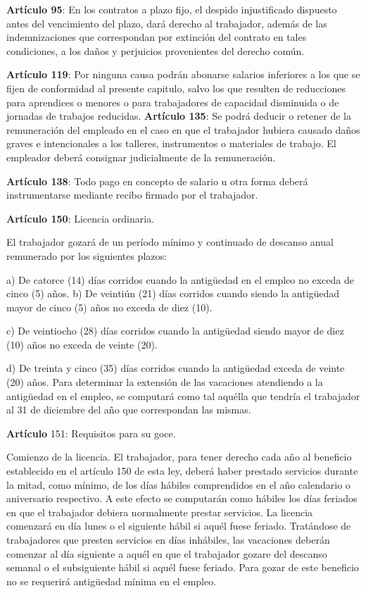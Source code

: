 \textbf{Artículo 95}: En los contratos a plazo fijo, el despido injustificado dispuesto antes del vencimiento del plazo, dará derecho al trabajador, además de las indemnizaciones que correspondan por extinción del contrato en tales condiciones, a los daños y perjuicios provenientes del derecho común.

\textbf{Artículo 119}: Por ninguna causa podrán abonarse salarios inferiores a los que se fijen de conformidad al presente capitulo, salvo los que resulten de reducciones para aprendices o menores o para trabajadores de capacidad disminuida o de jornadas de trabajos reducidas. \textbf{Artículo 135}: Se podrá deducir o retener de la remuneración del empleado en el caso en que el trabajador hubiera causado daños graves e intencionales a los talleres, instrumentos o materiales de trabajo. El empleador deberá consignar judicialmente de la remuneración.

\textbf{Artículo 138}: Todo pago en concepto de salario u otra forma deberá instrumentarse mediante recibo firmado por el trabajador.

\textbf{Artículo 150}: Licencia ordinaria.

El trabajador gozará de un período mínimo y continuado de descanso anual remunerado por los siguientes plazos:

a) De catorce (14) días corridos cuando la antigüedad en el empleo no exceda de cinco (5) años. b) De veintiún (21) días corridos cuando siendo la antigüedad mayor de cinco (5) años no exceda de diez (10).

c) De veintiocho (28) días corridos cuando la antigüedad siendo mayor de diez (10) años no exceda de veinte (20).

d) De treinta y cinco (35) días corridos cuando la antigüedad exceda de veinte (20) años. Para determinar la extensión de las vacaciones atendiendo a la antigüedad en el empleo, se computará como tal aquélla que tendría el trabajador al 31 de diciembre del año que correspondan las mismas.

\textbf{Artículo }151: Requisitos para su goce.

Comienzo de la licencia. El trabajador, para tener derecho cada año al beneficio establecido en el artículo 150 de esta ley, deberá haber prestado servicios durante la mitad, como mínimo, de los días hábiles comprendidos en el año calendario o aniversario respectivo. A este efecto se computarán como hábiles los días feriados en que el trabajador debiera normalmente prestar servicios. La licencia comenzará en día lunes o el siguiente hábil si aquél fuese feriado. Tratándose de trabajadores que presten servicios en días inhábiles, las vacaciones deberán comenzar al día siguiente a aquél en que el trabajador gozare del descanso semanal o el subsiguiente hábil si aquél fuese feriado. Para gozar de este beneficio no se requerirá antigüedad mínima en el empleo.

